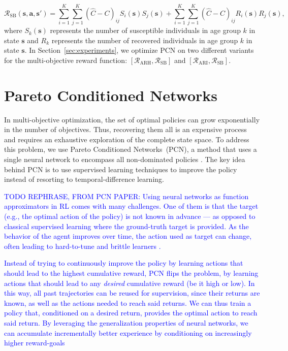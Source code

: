 \documentclass{article}
\renewcommand{\cite}[1]{\citep{#1}}
\newcommand\added[1]{\textcolor{blue}{#1}}
\newcommand{\mdprewardfn}{\mathcal{R}}
\newcommand{\mdpstate}{\mathbf{s}}
\newcommand{\mdpaction}{\mathbf{a}}
\newcommand{\agegroups}{K}
\begin{document}
\begin{equation}
    \mdprewardfn_{\text{SB}}(\mdpstate,\mdpaction,\mdpstate') = \sum_{i=1}^{\agegroups}\sum_{j=1}^{\agegroups}(\hat{C}-C)_{ij}S_i(\mdpstate)S_j(\mdpstate) + \sum_{i=1}^{\agegroups}\sum_{j=1}^{\agegroups}(\hat{C}-C)_{ij}R_i(\mdpstate)R_j(\mdpstate),
\end{equation}
where $S_k(\mdpstate)$ represents the number of susceptible individuals in age group $k$ in state $\mdpstate$ and $R_k$ represents the number of recovered individuals in age group $k$ in state $\mdpstate$. In Section~\ref{sec:experiments}, we optimize PCN on two different variants for the multi-objective reward function: $[\mdprewardfn_\text{ARH}, \mdprewardfn_\text{SB}]$ and $[\mdprewardfn_\text{ARI}, \mdprewardfn_\text{SB}]$.


\section{Pareto Conditioned Networks}
In multi-objective optimization, the set of optimal policies can grow exponentially in the number of objectives. Thus, recovering them all is an expensive process and requires an exhaustive exploration of the complete state space. To address this problem, we use Pareto Conditioned Networks~(PCN), a method that uses a single neural network to encompass all non-dominated policies \cite{reymond2022pcn}. The key idea behind PCN is to use supervised learning techniques to improve the policy instead of resorting to temporal-difference learning. %

\added{TODO REPHRASE, FROM PCN PAPER: Using neural networks as function approximators in RL comes with many challenges. One of them is that the target (e.g., the optimal action of the policy) is not known in advance --- as opposed to classical supervised learning where the ground-truth target is provided. As the behavior of the agent improves over time, the action used as target can change, often leading to hard-to-tune and brittle learners \cite{mnih2015,fu2019}.}

\added{Instead of trying to continuously improve the policy by learning actions that should lead to the highest cumulative reward, PCN flips the problem, by learning actions that should lead to any \emph{desired} cumulative reward (be it high or low). In this way, all past trajectories can be reused for supervision, since their returns are known, as well as the actions needed to reach said returns. We can thus train a policy that, conditioned on a desired return, provides the optimal action to reach said return. By leveraging the generalization properties of neural networks, we can accumulate incrementally better experience by conditioning on increasingly higher reward-goals}
\end{document}
